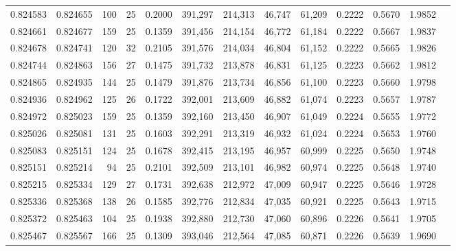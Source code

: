 \begin{tabular}{rrrrrrrrrrrrr}
0.824583 & 0.824655 &   100 &  25 &                                     0.2000 & 391,297 & 214,313 &  46,747 &  61,209 & 0.2222 & 0.5670 & 1.9852 \\
0.824661 & 0.824677 &   159 &  25 &                                     0.1359 & 391,456 & 214,154 &  46,772 &  61,184 & 0.2222 & 0.5667 & 1.9837 \\
0.824678 & 0.824741 &   120 &  32 &                                     0.2105 & 391,576 & 214,034 &  46,804 &  61,152 & 0.2222 & 0.5665 & 1.9826 \\
0.824744 & 0.824863 &   156 &  27 &                                     0.1475 & 391,732 & 213,878 &  46,831 &  61,125 & 0.2223 & 0.5662 & 1.9812 \\
0.824865 & 0.824935 &   144 &  25 &                                     0.1479 & 391,876 & 213,734 &  46,856 &  61,100 & 0.2223 & 0.5660 & 1.9798 \\
0.824936 & 0.824962 &   125 &  26 &                                     0.1722 & 392,001 & 213,609 &  46,882 &  61,074 & 0.2223 & 0.5657 & 1.9787 \\
0.824972 & 0.825023 &   159 &  25 &                                     0.1359 & 392,160 & 213,450 &  46,907 &  61,049 & 0.2224 & 0.5655 & 1.9772 \\
0.825026 & 0.825081 &   131 &  25 &                                     0.1603 & 392,291 & 213,319 &  46,932 &  61,024 & 0.2224 & 0.5653 & 1.9760 \\
0.825083 & 0.825151 &   124 &  25 &                                     0.1678 & 392,415 & 213,195 &  46,957 &  60,999 & 0.2225 & 0.5650 & 1.9748 \\
0.825151 & 0.825214 &    94 &  25 &                                     0.2101 & 392,509 & 213,101 &  46,982 &  60,974 & 0.2225 & 0.5648 & 1.9740 \\
0.825215 & 0.825334 &   129 &  27 &                                     0.1731 & 392,638 & 212,972 &  47,009 &  60,947 & 0.2225 & 0.5646 & 1.9728 \\
0.825336 & 0.825368 &   138 &  26 &                                     0.1585 & 392,776 & 212,834 &  47,035 &  60,921 & 0.2225 & 0.5643 & 1.9715 \\
0.825372 & 0.825463 &   104 &  25 &                                     0.1938 & 392,880 & 212,730 &  47,060 &  60,896 & 0.2226 & 0.5641 & 1.9705 \\
0.825467 & 0.825567 &   166 &  25 &                                     0.1309 & 393,046 & 212,564 &  47,085 &  60,871 & 0.2226 & 0.5639 & 1.9690 \\

\end{tabular}

